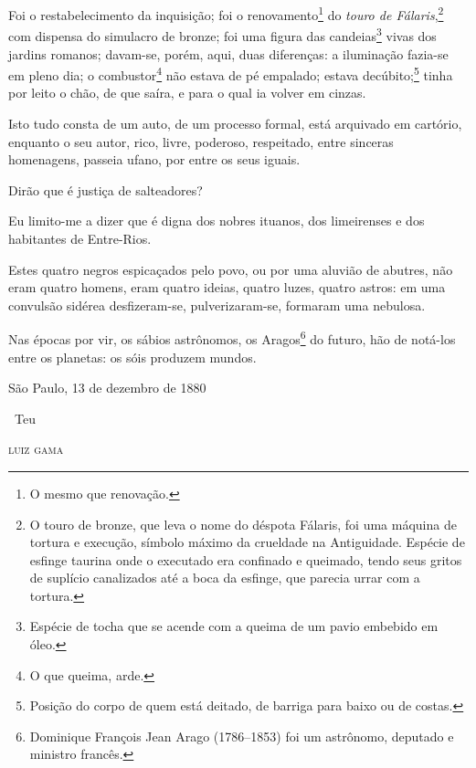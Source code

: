 Foi o restabelecimento da inquisição; foi o renovamento\footnote{O
  mesmo que renovação.} do \emph{touro de Fálaris},\footnote{O touro de
  bronze, que leva o nome do déspota Fálaris, foi uma máquina de tortura
  e execução, símbolo máximo da crueldade na Antiguidade. Espécie de
  esfinge taurina onde o executado era confinado e queimado, tendo seus
  gritos de suplício canalizados até a boca da esfinge, que parecia
  urrar com a tortura.} com dispensa do simulacro de bronze; foi uma
figura das candeias\footnote{Espécie de tocha que se acende com a
  queima de um pavio embebido em óleo.} vivas dos jardins romanos;
davam-se, porém, aqui, duas diferenças: a iluminação fazia-se em pleno
dia; o combustor\footnote{O que queima, arde.} não estava de pé
empalado; estava decúbito;\footnote{Posição do corpo de quem está
  deitado, de barriga para baixo ou de costas.} tinha por leito o chão,
de que saíra, e para o qual ia volver em cinzas.

Isto tudo consta de um auto, de um processo formal, está arquivado em
cartório, enquanto o seu autor, rico, livre, poderoso, respeitado, entre
sinceras homenagens, passeia ufano, por entre os seus iguais.

Dirão que é justiça de salteadores?

Eu limito-me a dizer que é digna dos nobres ituanos, dos limeirenses e
dos habitantes de Entre-Rios.

Estes quatro negros espicaçados pelo povo, ou por uma aluvião de
abutres, não eram quatro homens, eram quatro ideias, quatro luzes,
quatro astros: em uma convulsão sidérea desfizeram-se, pulverizaram-se,
formaram uma nebulosa.

Nas épocas por vir, os sábios astrônomos, os Aragos\footnote{Dominique
  François Jean Arago (1786--1853) foi um astrônomo, deputado e ministro
  francês.} do futuro, hão
de notá-los entre os planetas: os sóis produzem mundos.

\medskip

\hfill São Paulo, 13 de dezembro de 1880

\hfill\ Teu

\hfill\textsc{luiz gama}


